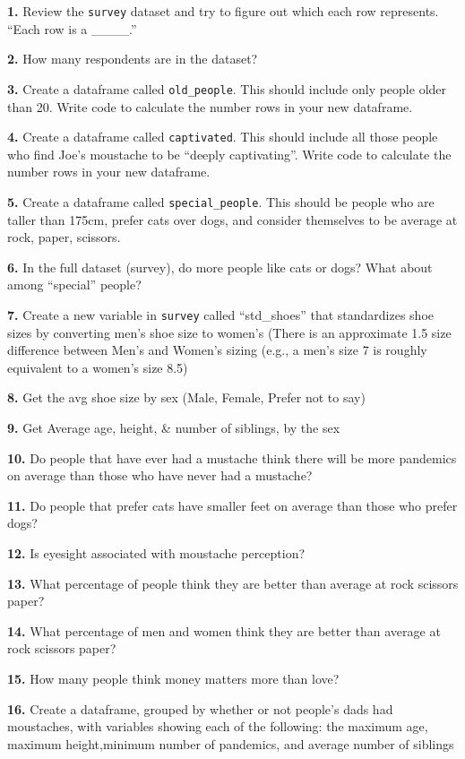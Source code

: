 \documentclass[]{book}
\begin{document}
\textbf{1.} Review the \texttt{survey} dataset and try to figure out which each row represents. ``Each row is a \_\_\_\_.''

\textbf{2.} How many respondents are in the dataset?

\textbf{3.} Create a dataframe called \texttt{old\_people}. This should include only people older than 20. Write code to calculate the number rows in your new dataframe.

\textbf{4.} Create a dataframe called \texttt{captivated}. This should include all those people who find Joe's moustache to be ``deeply captivating''. Write code to calculate the number rows in your new dataframe.

\textbf{5.} Create a dataframe called \texttt{special\_people}. This should be people who are taller than 175cm, prefer cats over dogs, and consider themselves to be average at rock, paper, scissors.

\textbf{6.} In the full dataset (survey), do more people like cats or dogs? What about among ``special'' people?

\textbf{7.} Create a new variable in \texttt{survey} called ``std\_shoes'' that standardizes shoe sizes by converting men's shoe size to women's (There is an approximate 1.5 size difference between Men's and Women's sizing (e.g., a men's size 7 is roughly equivalent to a women's size 8.5)

\textbf{8.} Get the avg shoe size by sex (Male, Female, Prefer not to say)

\textbf{9.} Get Average age, height, \& number of siblings, by the sex

\textbf{10.} Do people that have ever had a mustache think there will be more pandemics on average than those who have never had a mustache?

\textbf{11.} Do people that prefer cats have smaller feet on average than those who prefer dogs?

\textbf{12.} Is eyesight associated with moustache perception?

\textbf{13.} What percentage of people think they are better than average at rock scissors paper?

\textbf{14.} What percentage of men and women think they are better than average at rock scissors paper?

\textbf{15.} How many people think money matters more than love?

\textbf{16.} Create a dataframe, grouped by whether or not people's dads had moustaches, with variables showing each of the following: the maximum age, maximum height,minimum number of pandemics, and average number of siblings
\end{document}
